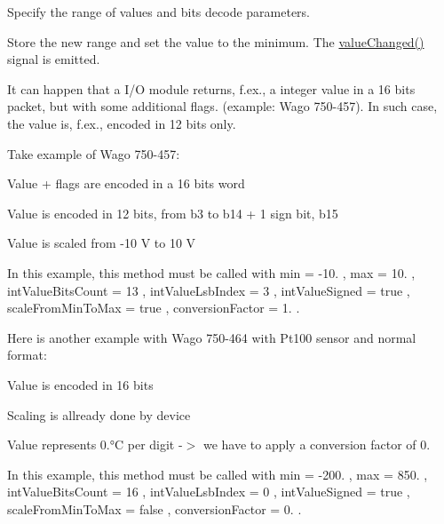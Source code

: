 Specify the range of values and bits decode parameters. 

Store the new range and set the value to the minimum. The \hyperlink{classmdt_abstract_io_a43feaa62996af78f64aea084122f1370}{value\-Changed()} signal is emitted.

It can happen that a I/\-O module returns, f.\-ex., a integer value in a 16 bits packet, but with some additional flags. (example\-: Wago 750-\/457). In such case, the value is, f.\-ex., encoded in 12 bits only.

Take example of Wago 750-\/457\-:
\begin{DoxyItemize}
\item Value + flags are encoded in a 16 bits word
\item Value is encoded in 12 bits, from b3 to b14 + 1 sign bit, b15
\item Value is scaled from -\/10 V to 10 V
\end{DoxyItemize}

In this example, this method must be called with min = -\/10. , max = 10. , int\-Value\-Bits\-Count = 13 , int\-Value\-Lsb\-Index = 3 , int\-Value\-Signed = true , scale\-From\-Min\-To\-Max = true , conversion\-Factor = 1. .

Here is another example with Wago 750-\/464 with Pt100 sensor and normal format\-:
\begin{DoxyItemize}
\item Value is encoded in 16 bits
\item Scaling is allready done by device
\item Value represents 0.°\-C per digit -\/$>$ we have to apply a conversion factor of 0.
\end{DoxyItemize}

In this example, this method must be called with min = -\/200. , max = 850. , int\-Value\-Bits\-Count = 16 , int\-Value\-Lsb\-Index = 0 , int\-Value\-Signed = true , scale\-From\-Min\-To\-Max = false , conversion\-Factor = 0. .


